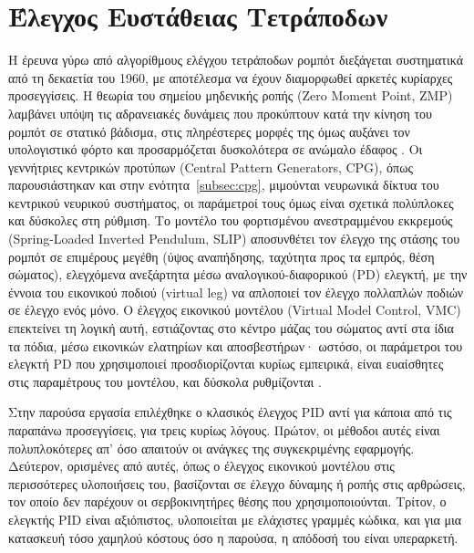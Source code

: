 \documentclass[11pt]{report}
\begin{document}
\section{Έλεγχος Ευστάθειας Τετράποδων}
Η έρευνα γύρω από αλγορίθμους ελέγχου τετράποδων ρομπότ διεξάγεται
συστηματικά από τη δεκαετία του 1960, με αποτέλεσμα να έχουν διαμορφωθεί
αρκετές κυρίαρχες προσεγγίσεις. Η θεωρία του σημείου μηδενικής ροπής (Zero
Moment Point, ZMP) λαμβάνει υπόψη τις αδρανειακές δυνάμεις που προκύπτουν
κατά την κίνηση του ρομπότ σε στατικό βάδισμα, στις πληρέστερες μορφές της
όμως αυξάνει τον υπολογιστικό φόρτο και προσαρμόζεται δυσκολότερα σε ανώμαλο
έδαφος \cite{shi_structural_2021}. Οι γεννήτριες κεντρικών προτύπων
(Central Pattern Generators, CPG), όπως παρουσιάστηκαν και στην
ενότητα~\ref{subsec:cpg}, μιμούνται νευρωνικά δίκτυα του κεντρικού νευρικού συστήματος, οι
παράμετροί τους όμως είναι σχετικά πολύπλοκες και δύσκολες στη ρύθμιση. Το
μοντέλο του φορτισμένου ανεστραμμένου εκκρεμούς (Spring-Loaded Inverted
Pendulum, SLIP) αποσυνθέτει τον έλεγχο της στάσης του ρομπότ σε επιμέρους
μεγέθη (ύψος αναπήδησης, ταχύτητα προς τα εμπρός, θέση σώματος), ελεγχόμενα
ανεξάρτητα μέσω αναλογικού-διαφορικού (PD) ελεγκτή, με την έννοια του
εικονικού ποδιού (virtual leg) να απλοποιεί τον έλεγχο πολλαπλών ποδιών σε
έλεγχο ενός μόνο. Ο έλεγχος εικονικού μοντέλου (Virtual Model Control, VMC)
επεκτείνει τη λογική αυτή, εστιάζοντας στο κέντρο μάζας του σώματος αντί
στα ίδια τα πόδια, μέσω εικονικών ελατηρίων και αποσβεστήρων· ωστόσο, οι
παράμετροι του ελεγκτή PD που χρησιμοποιεί προσδιορίζονται κυρίως εμπειρικά,
είναι ευαίσθητες στις παραμέτρους του μοντέλου, και δύσκολα ρυθμίζονται
\cite{shi_structural_2021}.

Στην παρούσα εργασία επιλέχθηκε ο κλασικός έλεγχος PID αντί για κάποια από
τις παραπάνω προσεγγίσεις, για τρεις κυρίως λόγους. Πρώτον, οι μέθοδοι αυτές
είναι πολυπλοκότερες απ' όσο απαιτούν οι ανάγκες της συγκεκριμένης εφαρμογής.
Δεύτερον, ορισμένες από αυτές, όπως ο έλεγχος εικονικού μοντέλου στις
περισσότερες υλοποιήσεις του, βασίζονται σε έλεγχο δύναμης ή ροπής στις
αρθρώσεις, τον οποίο δεν παρέχουν οι σερβοκινητήρες θέσης που
χρησιμοποιούνται. Τρίτον, ο ελεγκτής PID είναι αξιόπιστος, υλοποιείται με ελάχιστες γραμμές
κώδικα, και για μια κατασκευή τόσο χαμηλού κόστους όσο η παρούσα, η απόδοσή
του είναι υπεραρκετή.
\end{document}
